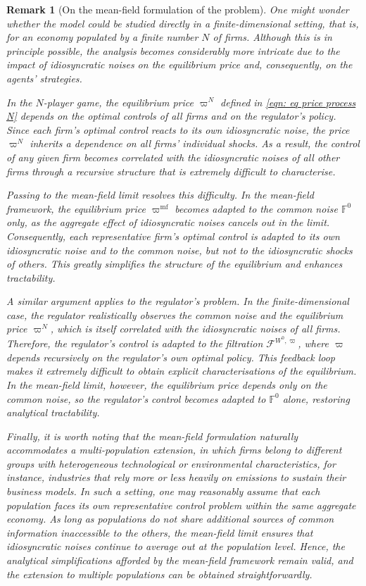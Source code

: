 \documentclass[10pt,a4paper]{amsart}
\newtheorem{remark}[theorem]{Remark}
\numberwithin{equation}{section}
\newcommand{\w}{\varpi}
\newcommand{\wmf}{\varpi^{\text{mf}}}
\newcommand{\F}{\mathbb{F}}
\begin{document}
\begin{remark}[On the mean-field formulation of the problem]
\label{rmk: defence of mfg}
One might wonder whether the model could be studied directly in a finite-dimensional setting, that is, for an economy populated by a finite number $N$ of firms. Although this is in principle possible, the analysis becomes considerably more intricate due to the impact of idiosyncratic noises on the equilibrium price and, consequently, on the agents’ strategies. 

In the $N$-player game, the equilibrium price $\w^N$ defined in \eqref{eqn: eq price process N} depends on the optimal controls of all firms and on the regulator’s policy. Since each firm’s optimal control reacts to its own idiosyncratic noise, the price $\w^N$ inherits a dependence on all firms’ individual shocks. As a result, the control of any given firm becomes correlated with the idiosyncratic noises of all other firms through a recursive structure that is extremely difficult to characterise. 

Passing to the mean-field limit resolves this difficulty. In the mean-field framework, the equilibrium price $\wmf$ becomes adapted to the common noise $\F^0$ only, as the aggregate effect of idiosyncratic noises cancels out in the limit. Consequently, each representative firm’s optimal control is adapted to its own idiosyncratic noise and to the common noise, but not to the idiosyncratic shocks of others. This greatly simplifies the structure of the equilibrium and enhances tractability.

A similar argument applies to the regulator’s problem. In the finite-dimensional case, the regulator realistically observes the common noise and the equilibrium price $\w^N$, which is itself correlated with the idiosyncratic noises of all firms. Therefore, the regulator’s control is adapted to the filtration $\mathcal{F}^{W^0, \w}$, where $\w$ depends recursively on the regulator’s own optimal policy. This feedback loop makes it extremely difficult to obtain explicit characterisations of the equilibrium. In the mean-field limit, however, the equilibrium price depends only on the common noise, so the regulator’s control becomes adapted to $\F^0$ alone, restoring analytical tractability.

Finally, it is worth noting that the mean-field formulation naturally accommodates a \emph{multi-population} extension, in which firms belong to different groups with heterogeneous technological or environmental characteristics, for instance, industries that rely more or less heavily on emissions to sustain their business models. In such a setting, one may reasonably assume that each population faces its own representative control problem within the same aggregate economy. As long as populations do not share additional sources of common information inaccessible to the others, the mean-field limit ensures that idiosyncratic noises continue to average out at the population level. Hence, the analytical simplifications afforded by the mean-field framework remain valid, and the extension to multiple populations can be obtained straightforwardly.
\end{remark}
\end{document}
